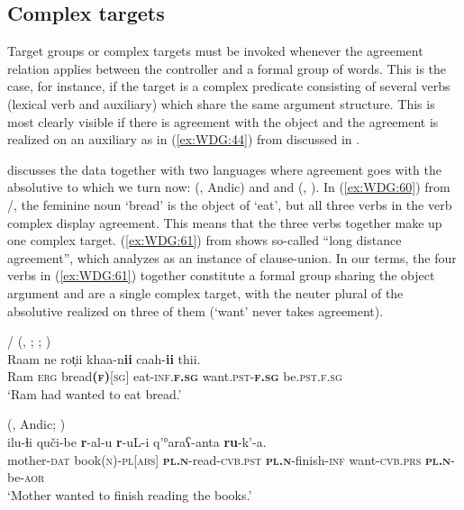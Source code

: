 \documentclass[output=collectionpaper]{langsci/langscibook}
\begin{document}
  \subsection{Complex targets}
\label{sec:WDG:7.4}

Target groups or complex targets must be invoked whenever the agreement relation applies between the controller and a formal group of words. This is the case, for instance, if the target is a complex predicate consisting of several verbs (lexical verb and auxiliary) which share the same argument structure. This is most clearly visible if there is agreement with the object and the agreement is realized on an auxiliary as in (\ref{ex:WDG:44}) from  discussed in .

\cite{Haspelmath1999} discusses the  data together with two languages where agreement goes with the absolutive to which we turn now:  (, Andic) and  and  (, ). In (\ref{ex:WDG:60}) from /, the feminine noun `bread' is the object of `eat', but all three verbs in the verb complex display agreement. This means that the three verbs together make up one complex target. (\ref{ex:WDG:61}) from  shows so-called ``long distance agreement'', which \cite{Haspelmath1999} analyzes as an instance of clause-union. In our terms, the four verbs in (\ref{ex:WDG:61}) together constitute a formal group sharing the object argument and are a single complex target, with the neuter plural of the absolutive realized on three of them (`want' never takes agreement).

\ea\label{ex:WDG:60}
/ (, ; \citealt[23]{Wunderlich1994}; \citealt[147]{Haspelmath1999})\\
\gll	Raam	ne	rot̩ii	khaa-n\textbf{ii}	caah-\textbf{ii}	thii.\\
	Ram	\textsc{erg}	bread\textsc{\textbf{(f)}[sg]}	eat-\textsc{inf.\textbf{f.sg}}	want.\textsc{pst-\textbf{f.sg}}	be.\textsc{pst.f.sg}\\
\glt	`Ram had wanted to eat bread.'\\
\z

\ea\label{ex:WDG:61}
 (, Andic; \citealt[143]{Haspelmath1999})\\
\gll	ilu-ɬi	quči-be	\textbf{r}-al-u	\textbf{r}-uL-i 	q'°araʕ-anta	\textbf{ru}-k'-a.\\
	mother-\textsc{dat}	book\textsc{(n)-pl[abs]}	\textbf{\textsc{pl.n}}-read-\textsc{cvb.pst}	\textbf{\textsc{pl.n}}-finish-\textsc{inf}	want-\textsc{cvb.prs}	\textbf{\textsc{pl.n}}-be-\textsc{aor}\\
\glt 	`Mother wanted to finish reading the books.'\\
\z
\end{document}
